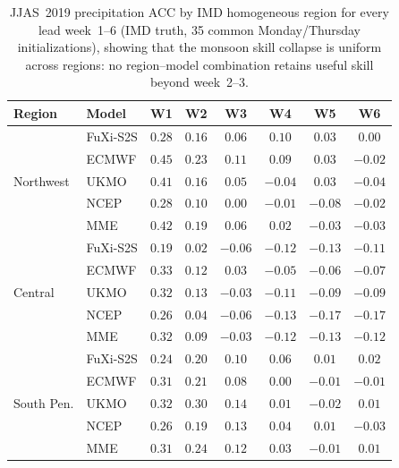     \begin{table}[t]\centering
    \small
    \setlength{\tabcolsep}{4pt}
    \caption{JJAS~2019 precipitation ACC by IMD homogeneous region for every lead week~1--6 (IMD truth, 35 common Monday/Thursday initializations), showing that the monsoon skill collapse is uniform across regions: no region--model combination retains useful skill beyond week~2--3.}
    \label{tab:reg_jjas_tp_w1w3}
    \begin{tabular}{llcccccc}\toprule
    Region & Model & W1 & W2 & W3 & W4 & W5 & W6 \\
    \midrule
    \multirow{5}{*}{Northwest} & FuXi-S2S       & $0.28$ & $0.16$ & $0.06$ & $\mathbf{0.10}$ & $\mathbf{0.03}$ & $\mathbf{0.00}$ \\
 & ECMWF          & $\mathbf{0.45}$ & $\mathbf{0.23}$ & $\mathbf{0.11}$ & $0.09$ & $0.03$ & $-0.02$ \\
 & UKMO           & $0.41$ & $0.16$ & $0.05$ & $-0.04$ & $0.03$ & $-0.04$ \\
 & NCEP           & $0.28$ & $0.10$ & $0.00$ & $-0.01$ & $-0.08$ & $-0.02$ \\
 & MME            & $0.42$ & $0.19$ & $0.06$ & $0.02$ & $-0.03$ & $-0.03$ \\
\midrule
\multirow{5}{*}{Central} & FuXi-S2S       & $0.19$ & $0.02$ & $-0.06$ & $-0.12$ & $-0.13$ & $-0.11$ \\
 & ECMWF          & $\mathbf{0.33}$ & $0.12$ & $\mathbf{0.03}$ & $\mathbf{-0.05}$ & $\mathbf{-0.06}$ & $\mathbf{-0.07}$ \\
 & UKMO           & $0.32$ & $\mathbf{0.13}$ & $-0.03$ & $-0.11$ & $-0.09$ & $-0.09$ \\
 & NCEP           & $0.26$ & $0.04$ & $-0.06$ & $-0.13$ & $-0.17$ & $-0.17$ \\
 & MME            & $0.32$ & $0.09$ & $-0.03$ & $-0.12$ & $-0.13$ & $-0.12$ \\
\midrule
\multirow{5}{*}{South Pen.} & FuXi-S2S       & $0.24$ & $0.20$ & $0.10$ & $\mathbf{0.06}$ & $0.01$ & $\mathbf{0.02}$ \\
 & ECMWF          & $0.31$ & $0.21$ & $0.08$ & $0.00$ & $-0.01$ & $-0.01$ \\
 & UKMO           & $\mathbf{0.32}$ & $\mathbf{0.30}$ & $\mathbf{0.14}$ & $0.01$ & $-0.02$ & $0.01$ \\
 & NCEP           & $0.26$ & $0.19$ & $0.13$ & $0.04$ & $\mathbf{0.01}$ & $-0.03$ \\
 & MME            & $0.31$ & $0.24$ & $0.12$ & $0.03$ & $-0.01$ & $0.01$ \\

\end{tabular}
\end{table}
